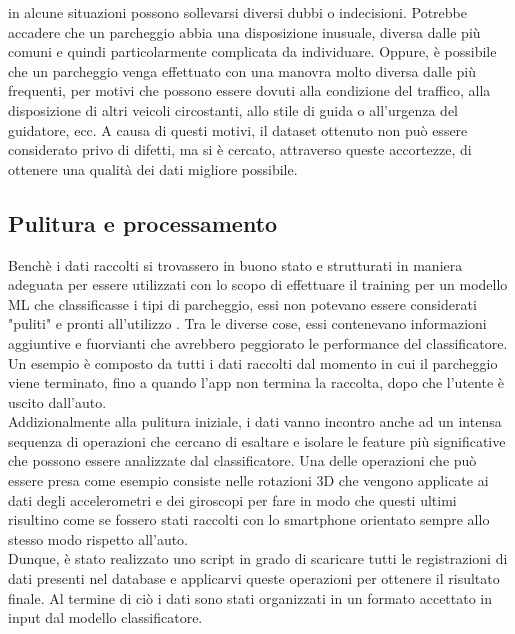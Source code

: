 in alcune situazioni possono sollevarsi diversi dubbi o indecisioni. Potrebbe accadere che un parcheggio
abbia una disposizione inusuale, diversa dalle più comuni e quindi particolarmente complicata da
individuare. Oppure, è possibile che un parcheggio venga effettuato con una manovra molto diversa dalle
più frequenti, per motivi che possono essere dovuti alla condizione del traffico, alla disposizione di
altri veicoli circostanti, allo stile di guida o all'urgenza del guidatore, ecc. A causa di questi
motivi, il dataset ottenuto non può essere considerato privo di difetti, ma si è cercato, attraverso
queste accortezze, di ottenere una qualità dei dati \cite{data_quality_considerations} migliore possibile.

\subsection{Pulitura e processamento}

Benchè i dati raccolti si trovassero in buono stato e strutturati in maniera adeguata per 
essere utilizzati con lo scopo di effettuare il training per un modello ML che classificasse
i tipi di parcheggio, essi non potevano essere considerati "puliti" e pronti all'utilizzo 
\cite{data_cleaning}.
Tra le diverse cose, essi contenevano informazioni aggiuntive e fuorvianti che avrebbero
peggiorato le performance del classificatore. Un esempio è composto da tutti i dati raccolti
dal momento in cui il parcheggio viene terminato, fino a quando l'app non termina la raccolta,
dopo che l'utente è uscito dall'auto.\\
Addizionalmente alla pulitura iniziale, i dati vanno incontro anche ad un intensa sequenza
di operazioni che cercano di esaltare e isolare le feature più significative 
\cite{data_preprocessing_supervised_learning} che possono
essere analizzate dal classificatore. Una delle operazioni che può essere presa come esempio 
consiste nelle rotazioni 3D \cite{applications_euler_rotation_angles} che vengono applicate 
ai dati degli accelerometri e dei giroscopi
per fare in modo che questi ultimi risultino come se fossero stati raccolti con lo smartphone
orientato sempre allo stesso modo rispetto all'auto.\\
Dunque, è stato realizzato uno script in grado di scaricare tutti le registrazioni di dati
presenti nel database e applicarvi queste operazioni per ottenere il risultato finale.
Al termine di ciò i dati sono stati organizzati in un formato accettato in input dal 
modello classificatore.


